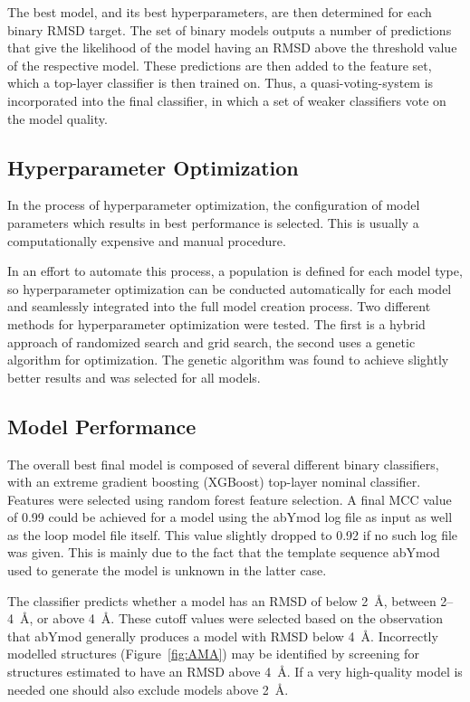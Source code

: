 \documentclass[12pt]{article}
\begin{document}
The best model, and its best hyperparameters, are then determined for
each binary RMSD target. The set of binary models outputs a number of
predictions that give the likelihood of the model having an RMSD above
the threshold value of the respective model. These predictions are
then added to the feature set, which a top-layer classifier is then
trained on. Thus, a quasi-voting-system is incorporated into the final
classifier, in which a set of weaker classifiers vote on the model
quality.

\subsection{Hyperparameter Optimization}
In the process of hyperparameter optimization, the configuration of
model parameters which results in best performance is selected. This
is usually a computationally expensive and manual procedure.

In an effort to automate this process, a population is defined for
each model type, so hyperparameter optimization can be conducted
automatically for each model and seamlessly integrated into the full
model creation process. Two different methods for hyperparameter
optimization were tested. The first is a hybrid approach of randomized
search and grid search, the second uses a genetic algorithm for
optimization. The genetic algorithm was found to achieve slightly
better results and was selected for all models.

\subsection{Model Performance}
The overall best final model is composed of several different binary
classifiers, with an extreme gradient boosting (XGBoost) top-layer
nominal classifier. Features were selected using random forest feature
selection. A final MCC value of 0.99 could be achieved for a model
using the abYmod log file as input as well as the loop model file
itself. This value slightly dropped to 0.92 if no such log file was
given. This is mainly due to the fact that the template sequence
abYmod used to generate the model is unknown in the latter case.

The classifier predicts whether a model has an RMSD of below 2~\AA,
between 2--4~\AA, or above 4~\AA. These cutoff values were selected
based on the observation that abYmod generally produces a model with
RMSD below 4~\AA. Incorrectly modelled structures (Figure~\ref{fig:AMA}) may
be identified by screening for structures estimated to have an RMSD
above 4~\AA. If a very high-quality model is needed one should also
exclude models above 2~\AA.
\end{document}
